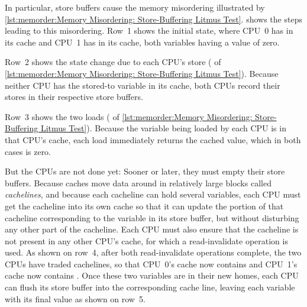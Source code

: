 In particular, store buffers cause the memory misordering
illustrated by
\cref{lst:memorder:Memory Misordering: Store-Buffering Litmus Test}.
shows the steps leading to this misordering.
Row~1 shows the initial state, where CPU~0 has  in its cache
and CPU~1 has  in its cache, both variables having a value of zero.
\begin{fcvref}
Row~2 shows the state change due to each CPU's store ( of
\cref{lst:memorder:Memory Misordering: Store-Buffering Litmus Test}).
Because neither CPU has the stored-to variable in its cache, both CPUs
record their stores in their respective store buffers.
\end{fcvref}

\QuickQuizEnd

\begin{fcvref}
Row~3 shows the two loads ( of
\cref{lst:memorder:Memory Misordering: Store-Buffering Litmus Test}).
Because the variable being loaded by each CPU is in that CPU's cache,
each load immediately returns the cached value, which in both cases
is zero.
\end{fcvref}

But the CPUs are not done yet: Sooner or later, they must empty their
store buffers.
Because caches move data around in relatively large blocks called
\emph{cachelines}, and because each cacheline can hold several
variables, each CPU must get the cacheline into its own cache so
that it can update the portion of that cacheline corresponding
to the variable in its store buffer, but without disturbing any
other part of the cacheline.
Each CPU must also ensure that the cacheline is not present in any other
CPU's cache, for which a read-invalidate operation is used.
As shown on row~4, after both read-invalidate operations complete,
the two CPUs have traded cachelines, so that CPU~0's cache now contains
 and CPU~1's cache now contains .
Once these two variables are in their new homes, each CPU can flush
its store buffer into the corresponding cache line, leaving each
variable with its final value as shown on row~5.

